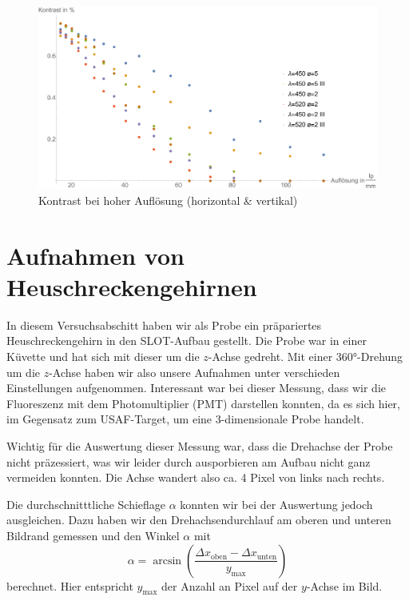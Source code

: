 \begin{figure}[H]
\centering
\includegraphics[width=1.0\linewidth]{IMAGE/Versuch2Plot2_all.pdf}
	\caption{Kontrast bei hoher Auflösung (horizontal \& vertikal)}
	\label{fig:Versuch2_Plot2_all}
\end{figure}



\section{Aufnahmen von Heuschreckengehirnen}
In diesem Versuchsabschitt haben wir als Probe ein präpariertes Heuschreckengehirn in den SLOT-Aufbau gestellt.
Die Probe war in einer Küvette und hat sich mit dieser um die $z$-Achse gedreht.
Mit einer 360°-Drehung um die $z$-Achse haben wir also unsere Aufnahmen unter verschieden Einstellungen aufgenommen.
Interessant war bei dieser Messung, dass wir die Fluoreszenz mit dem Photomultiplier (PMT) darstellen konnten, da es sich hier, im Gegensatz zum USAF-Target, um eine 3-dimensionale Probe handelt.

Wichtig für die Auswertung dieser Messung war, dass die Drehachse der Probe nicht präzessiert, was wir leider durch ausporbieren am Aufbau nicht ganz vermeiden konnten.
Die Achse wandert also ca. 4 Pixel von links nach rechts.

Die durchschnitttliche Schieflage $\alpha$  konnten wir bei der Auswertung jedoch ausgleichen.
Dazu haben wir den Drehachsendurchlauf am oberen und unteren Bildrand gemessen und den Winkel $\alpha$ mit
$$\alpha = \arcsin \left( \frac{\Delta{x_{\text{oben}}} - \Delta{x_{\text{unten}}}}{y_{\text{max}}} \right)$$
berechnet.
Hier entspricht $y_\text{max}$ der Anzahl an Pixel auf der $y$-Achse im Bild.

